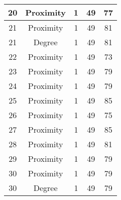 \documentclass[results.tex]{subfiles}
\begin{document}
\begin{center}
\begin{tabular}{| c || c | c | c | c |}
            \hline
            20                      & Proximity                    & 1                      & 49                      & 77                   \\
            \hline
            21                      & Proximity                    & 1                      & 49                      & 81                   \\
            \hline
            21                      & Degree                       & 1                      & 49                      & 81                   \\
            \hline
            22                      & Proximity                    & 1                      & 49                      & 73                   \\
            \hline
            23                      & Proximity                    & 1                      & 49                      & 79                   \\
            \hline
            24                      & Proximity                    & 1                      & 49                      & 79                   \\
            \hline
            25                      & Proximity                    & 1                      & 49                      & 85                   \\
            \hline
            26                      & Proximity                    & 1                      & 49                      & 75                   \\
            \hline
            27                      & Proximity                    & 1                      & 49                      & 85                   \\
            \hline
            28                      & Proximity                    & 1                      & 49                      & 81                   \\
            \hline
            29                      & Proximity                    & 1                      & 49                      & 79                   \\
            \hline
            30                      & Proximity                    & 1                      & 49                      & 79                   \\
            \hline
            30                      & Degree                       & 1                      & 49                      & 79                   \\

\end{tabular}
\end{center}
\end{document}
